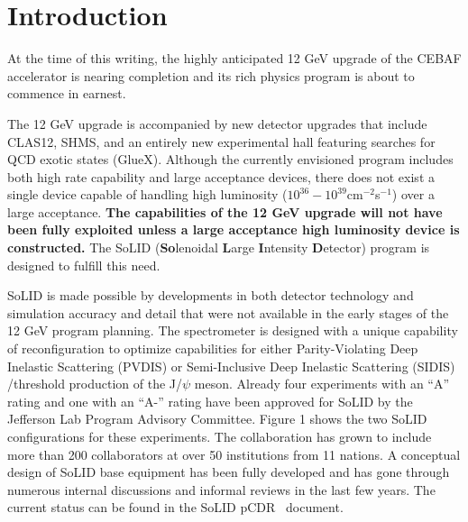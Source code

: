 \documentclass[12pt]{article}
\begin{document}
\newpage
% 
% 


\newpage
\section{Introduction}
At the time of this writing, the highly anticipated 12 GeV upgrade of
the CEBAF accelerator is nearing completion and its rich physics
program is about to commence in earnest. 

The 12 GeV upgrade is accompanied by new detector upgrades that
include CLAS12, SHMS, and an entirely new experimental hall 
featuring searches for QCD exotic states (GlueX).  Although the
currently envisioned program includes both high rate capability and
large acceptance devices, there does not exist a single device capable
of handling high luminosity ($10^{36}-10^{39}$cm$^{-2}$s$^{-1}$) over a large 
acceptance.  {\bf The capabilities of the 12 GeV upgrade will not have been fully
  exploited unless a large acceptance high luminosity device is
  constructed.}  The SoLID ({\bf So}lenoidal {\bf L}arge {\bf
  I}ntensity {\bf D}etector) program is designed to fulfill this need.

SoLID is made possible by developments in both detector technology and
simulation accuracy and detail that were not available in the early
stages of the 12 GeV program planning.  The spectrometer is designed
with a unique capability of reconfiguration to optimize capabilities
for either Parity-Violating Deep Inelastic Scattering (PVDIS) or
Semi-Inclusive Deep Inelastic Scattering (SIDIS) /threshold production
of the J/$\psi$ meson.  Already four experiments with an ``A'' rating and
one with an ``A-'' rating have been approved for SoLID by the 
Jefferson Lab Program Advisory Committee. Figure 1 shows 
the two SoLID configurations for these experiments. The
collaboration has grown to include more than 200 collaborators at over 
50 institutions from 11 nations. A conceptual design of SoLID base equipment
has been fully developed and has gone through numerous internal discussions and
informal reviews in the last few years. The current status can be found in the SoLID 
pCDR~\cite{pCDR} document. 
\end{document}
